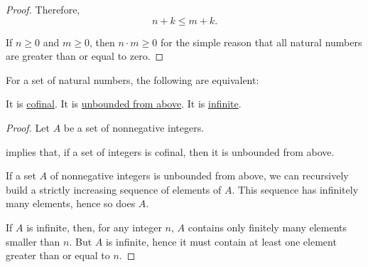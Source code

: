\begin{proof}
  Therefore,
  \begin{equation*}
    n + k \leq m + k.
  \end{equation*}

   If \( n \geq 0 \) and \( m \geq 0 \), then \( n \cdot m \geq 0 \) for the simple reason that all natural numbers are greater than or equal to zero.
\end{proof}

\begin{proposition}\label{thm:natural_numbers_confinal_equivalence}
  For a set of natural numbers, the following are equivalent:
  \begin{thmenum}
     It is \hyperref[def:cofinal_set]{cofinal}.
     It is \hyperref[def:extremal_points/bounds]{unbounded from above}.
     It is \hyperref[def:set_finiteness]{infinite}.
  \end{thmenum}
\end{proposition}
\begin{proof}
  Let \( A \) be a set of nonnegative integers.

    implies that, if a set of integers is cofinal, then it is unbounded from above.

   If a set \( A \) of nonnegative integers is unbounded from above, we can recursively build a strictly increasing sequence of elements of \( A \). This sequence has infinitely many elements, hence so does \( A \).

   If \( A \) is infinite, then, for any integer \( n \), \( A \) contains only finitely many elements smaller than \( n \). But \( A \) is infinite, hence it must contain at least one element greater than or equal to \( n \).
\end{proof}

